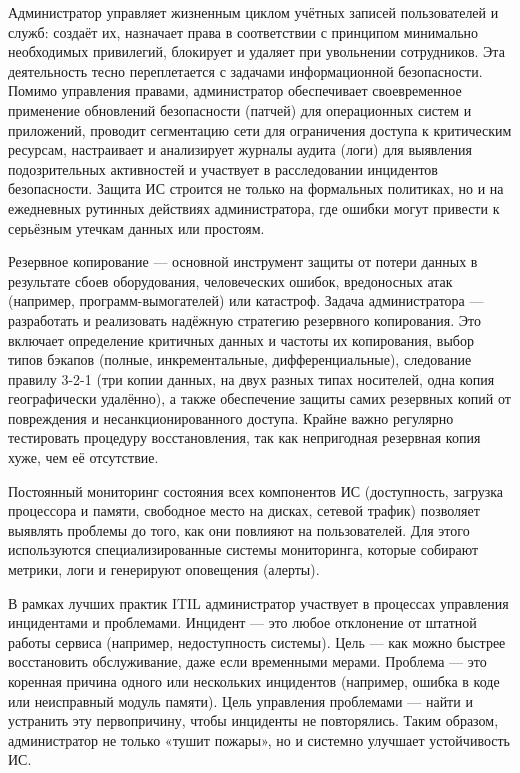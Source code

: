 \documentclass{SibFU-docs}
\begin{document}
Администратор управляет жизненным циклом учётных записей пользователей и служб: создаёт их, назначает права в соответствии с принципом минимально необходимых привилегий, блокирует и удаляет при увольнении сотрудников. Эта деятельность тесно переплетается с задачами информационной безопасности. Помимо управления правами, администратор обеспечивает своевременное применение обновлений безопасности (патчей) для операционных систем и приложений, проводит сегментацию сети для ограничения доступа к критическим ресурсам, настраивает и анализирует журналы аудита (логи) для выявления подозрительных активностей и участвует в расследовании инцидентов безопасности. Защита ИС строится не только на формальных политиках, но и на ежедневных рутинных действиях администратора, где ошибки могут привести к серьёзным утечкам данных или простоям. \cite{studfile_admin_ib_2025}


Резервное копирование — основной инструмент защиты от потери данных в результате сбоев оборудования, человеческих ошибок, вредоносных атак (например, программ-вымогателей) или катастроф. Задача администратора — разработать и реализовать надёжную стратегию резервного копирования. Это включает определение критичных данных и частоты их копирования, выбор типов бэкапов (полные, инкрементальные, дифференциальные), следование правилу 3-2-1 (три копии данных, на двух разных типах носителей, одна копия географически удалённо), а также обеспечение защиты самих резервных копий от повреждения и несанкционированного доступа. Крайне важно регулярно тестировать процедуру восстановления, так как непригодная резервная копия хуже, чем её отсутствие. \cite{veeam_backup_recovery_2024}


Постоянный мониторинг состояния всех компонентов ИС (доступность, загрузка процессора и памяти, свободное место на дисках, сетевой трафик) позволяет выявлять проблемы до того, как они повлияют на пользователей. Для этого используются специализированные системы мониторинга, которые собирают метрики, логи и генерируют оповещения (алерты).

В рамках лучших практик ITIL администратор участвует в процессах управления инцидентами и проблемами. Инцидент — это любое отклонение от штатной работы сервиса (например, недоступность системы). Цель — как можно быстрее восстановить обслуживание, даже если временными мерами. Проблема — это коренная причина одного или нескольких инцидентов (например, ошибка в коде или неисправный модуль памяти). Цель управления проблемами — найти и устранить эту первопричину, чтобы инциденты не повторялись. Таким образом, администратор не только «тушит пожары», но и системно улучшает устойчивость ИС. \cite{OGC_ITIL_2007}
\end{document}
